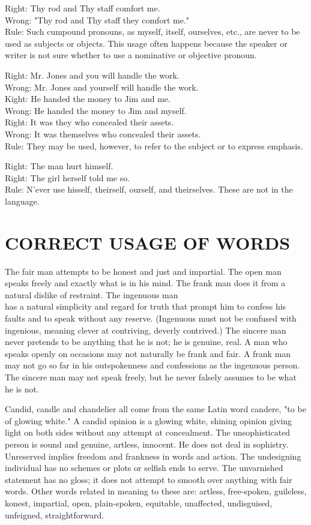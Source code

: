 \documentclass[10pt]{article}
\begin{document}
Right: Thy rod and Thy staff comfort me.\\
Wrong: "Thy rod and Thy staff they comfort me."\\
Rule: Such cumpound pronouns, as myself, itself, ourselves, etc., are never to be used as subjects or objects. This usage often happens because the speaker or writer is not sure whether to use a nominative or objective pronoun.

Right: Mr. Jones and you will handle the work.\\
Wrong: Mr. Jones and yourself will handle the work.\\
Kight: He handed the money to Jim and me.\\
Wrong: He handed the money to Jim and myself.\\
Right: It was they who concealed their assets.\\
Wrong: It was themselves who concealed their assets.\\
Rule: They may be used, however, to refer to the subject or to express emphasis.

Right: The man hurt himself.\\
Right: The girl herself told me so.\\
Rule: N'ever use hisself, theirself, ourself, and theirselves. These are not in the language.

\section*{CORRECT USAGE OF WORDS}
The fair man attempts to be honest and just and impartial. The open man speaks freely and exactly what is in his mind. The frank man does it from a natural dislike of restraint. The ingenuous man\\
has a natural simplicity and regard for truth that prompt him to confess his faults and to speak without any reserve. (Ingenuous must not be confused with ingenious, meaning clever at contriving, deverly contrived.) The sincere man never pretends to be anything that he is not; he is genuine, real. A man who speaks openly on occasions may not naturally be frank and fair. A frank man may not go so far in his outspokenness and confessions as the ingenuous person. The sincere man may not speak freely, but he never falsely assumes to be what he is not.

Candid, candle and chandelier all come from the same Latin word candere, "to be of glowing white." A candid opinion is a glowing white, shining opinion giving light on both sides without any attempt at concealment. The unsophisticated person is sound and genuine, artless, innocent. He does not deal in sophistry. Unreserved implies freedom and frankness in words and action. The undesigning individual has no schemes or plots or selfish ends to serve. The unvarnished statement has no gloss; it does not attempt to smooth over anything with fair words. Other words related in meaning to these are: artless, free-spoken, guileless, konest, impartial, open, plain-spoken, equitable, unaffected, undisguised, unfeigned, straightforward.
\end{document}
